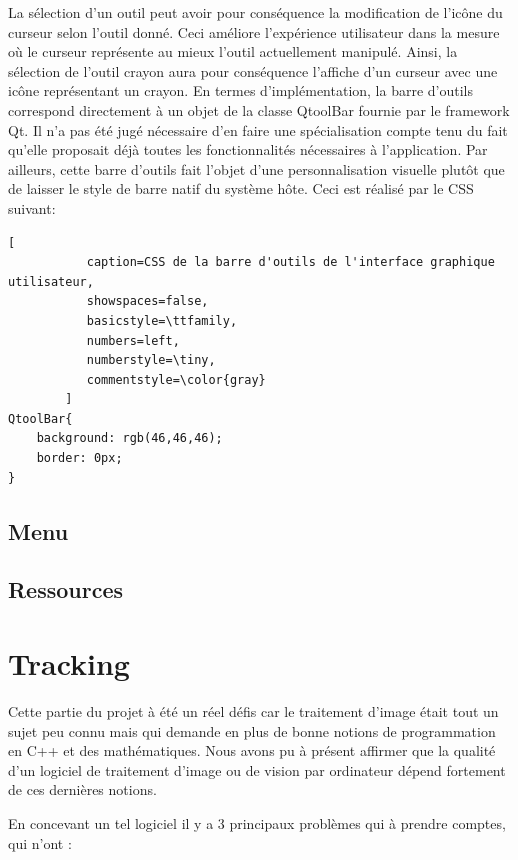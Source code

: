 \documentclass[11pt,a4paper,oldfontcommands]{memoir}
\begin{document}
La sélection d'un outil peut avoir pour conséquence la modification de l'icône du curseur selon l'outil donné. Ceci améliore l'expérience utilisateur dans la mesure où le curseur représente au mieux l'outil actuellement manipulé. Ainsi, la sélection de l'outil crayon aura pour conséquence l'affiche d'un curseur avec une icône représentant un crayon. En termes d'implémentation, la barre d'outils correspond directement à un objet de la classe QtoolBar fournie par le framework Qt. Il n'a pas été jugé nécessaire d'en faire une spécialisation compte tenu du fait qu'elle proposait déjà toutes les fonctionnalités nécessaires à l'application. Par ailleurs, cette barre d'outils fait l'objet d'une personnalisation visuelle plutôt que de laisser le style de barre natif du système hôte. Ceci est réalisé par le CSS suivant:

\begin{lstlisting}[
           caption=CSS de la barre d'outils de l'interface graphique utilisateur,
           showspaces=false,
           basicstyle=\ttfamily,
           numbers=left,
           numberstyle=\tiny,
           commentstyle=\color{gray}
        ]
QtoolBar{
    background: rgb(46,46,46);
    border: 0px;
}
\end{lstlisting}

\newpage

\subsection{Menu}

\subsection{Ressources}

\section{Tracking}

Cette partie du projet à été un réel défis car le traitement d'image était tout un sujet peu connu mais qui demande en plus de bonne notions de programmation en C++ et des mathématiques. Nous avons pu à présent affirmer que la qualité d'un logiciel de traitement d'image ou de vision par ordinateur dépend fortement de ces dernières notions.

En concevant un tel logiciel il y a 3 principaux problèmes qui à prendre comptes, qui n'ont :
\end{document}
